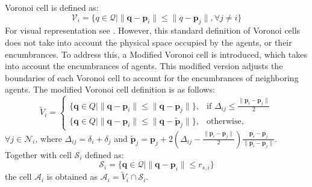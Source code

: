         Voronoi cell is defined as: 
        \begin{equation}
            \mathcal{V}_i = \{q \in \mathcal{Q} \lvert \lVert \mathbf{q} - \mathbf{p}_i \rVert \leq \lVert q - \mathbf{p}_j \rVert, \forall j \neq i\}
        \end{equation}
        For visual representation see . 
        However, this standard definition of Voronoi cells does not take into account the physical space occupied by the agents, or their encumbrances. 
        To address this, a Modified Voronoi cell is introduced, which takes into account the encumbrances of agents.
        This modified version adjusts the boundaries of each Voronoi cell to account for the encumbrances of neighboring agents.
        The modified Voronoi cell definition is as follows:
        \begin{equation}
            \tilde{V}_i = 
            \begin{cases}
            \{ \mathbf{q} \in Q \mid \| \mathbf{q} - \mathbf{p}_i \| \leq \| \mathbf{q} - \mathbf{p}_j \| \}, & \text{if } \Delta_{ij} \leq \frac{\| \mathbf{p}_i - \mathbf{p}_j \|}{2} \\
            \{ \mathbf{q} \in Q \mid \| \mathbf{q} - \mathbf{p}_i \| \leq \| \mathbf{q} - \tilde{\mathbf{p}}_j \| \}, & \text{otherwise},
            \end{cases}
        \end{equation}
        $\forall j \in \mathcal{N}_i$, where $\Delta_{ij} = \delta_i + \delta_j$ and $\tilde{\mathbf{p}}_j = \mathbf{p}_j + 2(\Delta_{ij} - \frac{\| \mathbf{p}_i - \mathbf{p}_j \|}{2})\frac{ \mathbf{p}_i - \mathbf{p}_j }{\| \mathbf{p}_i - \mathbf{p}_j \|}$.
        Together with cell $\mathcal{S}_i$ defined as: 
        \begin{equation}
            \mathcal{S}_i = \{\mathbf{q} \in \mathcal{Q} | \| \mathbf{q} - \mathbf{p}_i \| \leq r_{s,i}\}
        \end{equation}
        the cell $\mathcal{A}_i$ is obtained as $\mathcal{A}_i = \tilde{V}_i \cap \mathcal{S}_i$.
